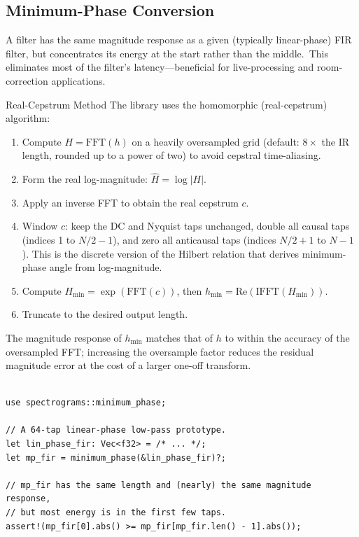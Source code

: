 \subsection{Minimum-Phase Conversion}\label{subsec:minimum_phase}

A  filter has the same magnitude response as a
given (typically linear-phase) FIR filter, but concentrates its energy
at the start rather than the middle.\ This eliminates most of the
filter's latency---beneficial for live-processing and room-correction
applications.

\begin{concept}{Real-Cepstrum Method}
  The library uses the homomorphic (real-cepstrum) algorithm:
  \begin{enumerate}
    \item Compute $H = \text{FFT}(h)$ on a heavily oversampled grid
      (default: $8\times$ the IR length, rounded up to a power of two)
      to avoid cepstral time-aliasing.
    \item Form the real log-magnitude: $\hat{H} = \log|H|$.
    \item Apply an inverse FFT to obtain the real cepstrum $c$.
    \item Window $c$: keep the DC and Nyquist taps unchanged,
      double all causal taps (indices 1 to $N/2 - 1$), and zero all
      anticausal taps (indices $N/2 + 1$ to $N - 1$).
      This is the discrete version of the Hilbert relation that derives
      minimum-phase angle from log-magnitude.
    \item Compute $H_{\min} = \exp(\text{FFT}(c))$, then
      $h_{\min} = \text{Re}(\text{IFFT}(H_{\min}))$.
    \item Truncate to the desired output length.
  \end{enumerate}

  The magnitude response of $h_{\min}$ matches that of $h$ to within
  the accuracy of the oversampled FFT; increasing the oversample factor
  reduces the residual magnitude error at the cost of a larger one-off
  transform.
\end{concept}

\begin{lstlisting}[caption={Converting linear-phase FIR to minimum phase}]

use spectrograms::minimum_phase;

// A 64-tap linear-phase low-pass prototype.
let lin_phase_fir: Vec<f32> = /* ... */;
let mp_fir = minimum_phase(&lin_phase_fir)?;

// mp_fir has the same length and (nearly) the same magnitude response,
// but most energy is in the first few taps.
assert!(mp_fir[0].abs() >= mp_fir[mp_fir.len() - 1].abs());
\end{lstlisting}

